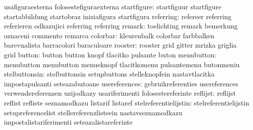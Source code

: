                                   usafiguraesterna                 folosestefiguraexterna
                     startfigure: startfiguur                      startfigure
                                  startabbildung                   startobraz
                                  iniziafigura                     startfigura
                       referring: refereer                         referring
                                  referieren                       odkazujici
                                  referring                        referring %
                          remark: toelichting                      remark
                                  bemerkung                        oznaceni
                                  commento                         remarca
                        colorbar: kleurenbalk                      colorbar
                                  farbbalken                       barevnalista
                                  barracolori                      baraculoare
                         rooster: rooster                          grid
                                  gitter                           mrizka
                                  griglia                          grid
                          button: button                           button
                                  knopf                            tlacitko
                                  pulsante                         buton
                      menubutton: menubutton                       menubutton
                                  menueknopf                       tlacitkomenu
                                  pulsantemenu                     butonmeniu
                   stelbuttonsin: stelbuttonsin                    setupbuttons
                                  stelleknopfein                   nastavtlacitka
                                  impostapulsanti                  seteazabutoane
                   usereferences: gebruikreferenties               usereferences
                                  verwendereferenzen               uzijodkazy
                                  usariferimenti                   folosestereferinte
                        reflijst: reflijst                         reflist
                                  refliste                         seznamodkazu
                                  listarif                         listaref
           stelreferentielijstin: stelreferentielijstin            setupreferencelist
                                  stellereferenzlisteein           nastavseznamodkazu
                                  impostalistariferimenti          seteazalistareferinte
